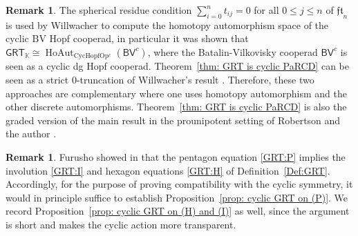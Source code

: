 \documentclass{amsart}
\newcommand{\kk}{\mathbb{K}}    %
\newcommand{\PaRB}{\mathsf{PaRB}}
\newcommand{\PaRCD}{\mathsf{PaRCD}}
\newcommand{\PaCD}{\mathsf{PaCD}}
\newcommand{\hPaCD}{{\PaCD}_{\kk}}
\newcommand{\hPaRB}{{\PaRB}_{\kk}}
\newcommand{\hPaRCD}{{\PaRCD}_{\kk}}
\newcommand{\cyc}{\mathbf{cyc}}
\newcommand{\Cyc}{\mathbf{Cyc}}
\newcommand{\Op}{\mathbf{Op}}
\newcommand{\Aut}{\operatorname{Aut}}
\newcommand{\HoAut}{\operatorname{HoAut}}
\newcommand{\GT}{{\mathsf{GT}}}
\newcommand{\GRT}{{\mathsf{GRT}}}
\newcommand{\fft}{\mathfrak{ft}}
\theoremstyle{definition}
\newtheorem{remark}[theorem]{Remark}%
\numberwithin{equation}{section}
\begin{document}

\begin{remark}
The spherical residue condition $\sum_{i=0}^n t_{ij} = 0$ for all $0 \leq j \leq n$ of $\fft_{n}$ is used by Willwacher \cite{willwacher2024cyclic} to compute the homotopy automorphism space of the cyclic BV Hopf cooperad, in particular it was shown that  $\GRT_{\kk} \cong \HoAut_{\mathrm{CycHopfOp^{c}}}(\mathsf{BV}^{c})$, where the Batalin-Vilkovisky cooperad $\mathsf{BV}^{c}$ is seen as a cyclic dg Hopf cooperad. Theorem~\ref{thm: GRT is cyclic PaRCD} can be seen as a strict $0$-truncation of Willwacher's result \cite[Corollary 1.5]{willwacher2024cyclic}. Therefore, these two approaches are complementary where one uses homotopy automorphism and the other discrete automorphisms. Theorem~\ref{thm: GRT is cyclic PaRCD} is also the graded version of the main result in the prounipotent setting of Robertson and the author \cite{RS2025cyclicgt}.
\end{remark}

\begin{remark}
Furusho showed in \cite{Furusho_pentagon} that the pentagon equation \eqref{GRT:P} implies the involution \eqref{GRT:I} and hexagon equations \eqref{GRT:H} of Definition~\ref{Def:GRT}. Accordingly, for the purpose of proving compatibility with the cyclic symmetry, it would in principle suffice to establish Proposition~\ref{prop: cyclic GRT on (P)}. We record Proposition~\ref{prop: cyclic GRT on (H) and (I)} as well, since the argument is short and makes the cyclic action more transparent.

\end{remark}
\end{document}
